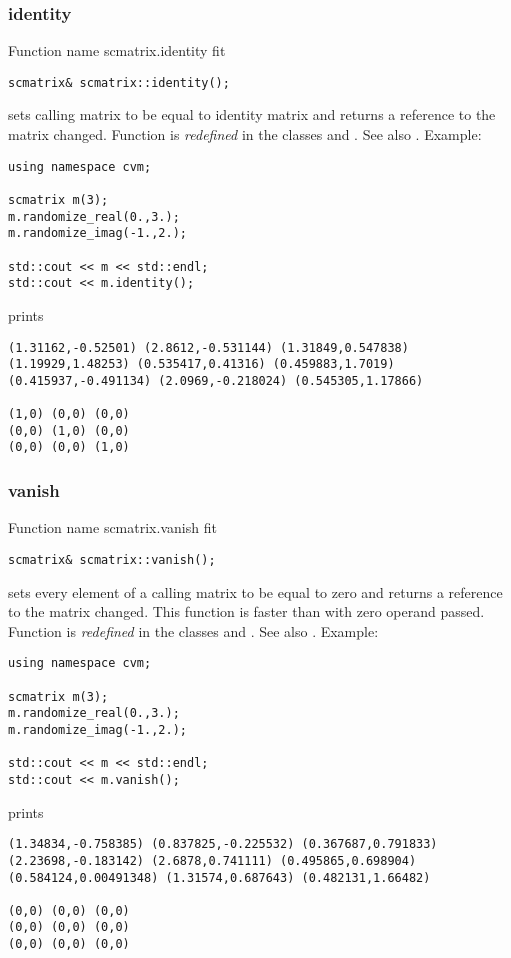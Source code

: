 \subsubsection{identity}
Function%
\pdfdest name {scmatrix.identity} fit
\begin{verbatim}
scmatrix& scmatrix::identity();
\end{verbatim}
sets  calling matrix to be equal to identity matrix
and returns a reference to
the matrix changed. 
Function is \emph{redefined} in the classes
 and
.
See also .
Example:
\begin{Verbatim}
using namespace cvm;

scmatrix m(3);
m.randomize_real(0.,3.);
m.randomize_imag(-1.,2.);

std::cout << m << std::endl;
std::cout << m.identity();
\end{Verbatim}
prints
\begin{Verbatim}
(1.31162,-0.52501) (2.8612,-0.531144) (1.31849,0.547838)
(1.19929,1.48253) (0.535417,0.41316) (0.459883,1.7019)
(0.415937,-0.491134) (2.0969,-0.218024) (0.545305,1.17866)

(1,0) (0,0) (0,0)
(0,0) (1,0) (0,0)
(0,0) (0,0) (1,0)
\end{Verbatim}
\newpage



\subsubsection{vanish}
Function%
\pdfdest name {scmatrix.vanish} fit
\begin{verbatim}
scmatrix& scmatrix::vanish();
\end{verbatim}
sets every element of a calling matrix to be equal to zero
and returns a reference to
the matrix changed. This function is faster
than
with zero operand passed.
Function is \emph{redefined} in the classes
 and
.
See also .
Example:
\begin{Verbatim}
using namespace cvm;

scmatrix m(3);
m.randomize_real(0.,3.);
m.randomize_imag(-1.,2.);

std::cout << m << std::endl;
std::cout << m.vanish();
\end{Verbatim}
prints
\begin{Verbatim}
(1.34834,-0.758385) (0.837825,-0.225532) (0.367687,0.791833)
(2.23698,-0.183142) (2.6878,0.741111) (0.495865,0.698904)
(0.584124,0.00491348) (1.31574,0.687643) (0.482131,1.66482)

(0,0) (0,0) (0,0)
(0,0) (0,0) (0,0)
(0,0) (0,0) (0,0)
\end{Verbatim}
\newpage



